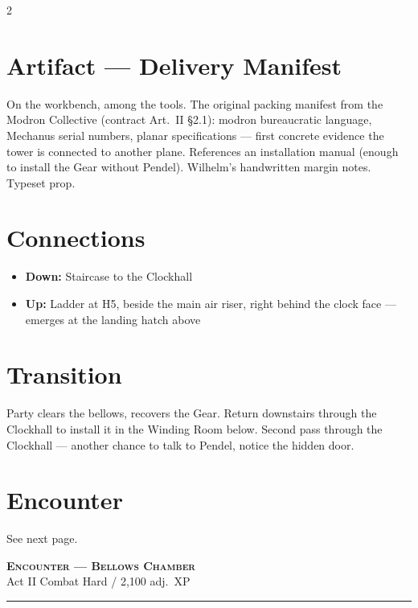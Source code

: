 \documentclass[10pt,letterpaper]{article}
\newcommand{\sceneheader}[4]{%
  \fancyhead[L]{\small\textcolor{accent}{\scshape #1}}%
  \fancyhead[R]{\small\textcolor{accent}{#2 \quad \textbullet \quad #3}}%
  \begin{center}
  {\LARGE\bfseries\scshape\textcolor{accent}{#1}}\\[2pt]
  {\small #2 \quad \textbullet \quad #3 \quad \textbullet \quad #4}\\[2pt]
  \textcolor{rulecol}{\rule{0.5\textwidth}{0.8pt}}
  \end{center}
  \vspace{-4pt}
}
\begin{document}
\begin{multicols}{2}
\section*{Artifact --- Delivery Manifest}
On the workbench, among the tools. The original packing manifest from the Modron Collective (contract Art.\ II \S2.1): modron bureaucratic language, Mechanus serial numbers, planar specifications --- first concrete evidence the tower is connected to another plane. References an installation manual (enough to install the Gear without Pendel). Wilhelm's handwritten margin notes. Typeset prop.

\columnbreak

\section*{Connections}
\begin{itemize}
\item \textbf{Down:} Staircase to the Clockhall
\item \textbf{Up:} Ladder at H5, beside the main air riser, right behind the clock face --- emerges at the landing hatch above
\end{itemize}

\section*{Transition}
Party clears the bellows, recovers the Gear. Return downstairs through the Clockhall to install it in the Winding Room below. Second pass through the Clockhall --- another chance to talk to Pendel, notice the hidden door.

\section*{Encounter}
See next page.

\end{multicols}

\newpage


\label{sec:enc-bellows}\sceneheader{Encounter --- Bellows Chamber}{Act II}{Combat}{Hard / {\texttildelow}2,100 adj.\ XP}
\end{document}
